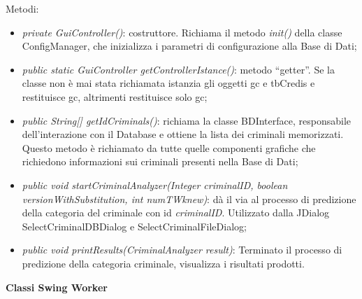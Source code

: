 Metodi:
\begin{itemize}
	\item \textit{private GuiController()}: costruttore. Richiama il metodo \textit{init()} della classe ConfigManager, che inizializza i parametri di configurazione alla Base di Dati;
	\item \textit{ public static GuiController getControllerIstance()}: metodo ``getter''. Se la classe non è mai stata richiamata istanzia gli oggetti gc e tbCredis e restituisce gc, altrimenti restituisce solo gc;
	\item \textit{public String[] getIdCriminals()}: richiama la classe BDInterface, responsabile dell'interazione con il Database e ottiene la lista dei criminali memorizzati. Questo metodo è richiamato da tutte quelle componenti grafiche che richiedono informazioni sui criminali presenti nella Base di Dati;
	\item \textit{public void startCriminalAnalyzer(Integer criminalID, boolean versionWithSubstitution, int numTWknew)}: dà il via al processo di predizione della categoria del criminale con id \textit{criminalID}. Utilizzato dalla JDialog SelectCriminalDBDialog e SelectCriminalFileDialog;
	\item \textit{public void printResults(CriminalAnalyzer result)}: Terminato il processo di predizione della categoria criminale, visualizza i risultati prodotti.
\end{itemize}

\textbf{Classi Swing Worker}

